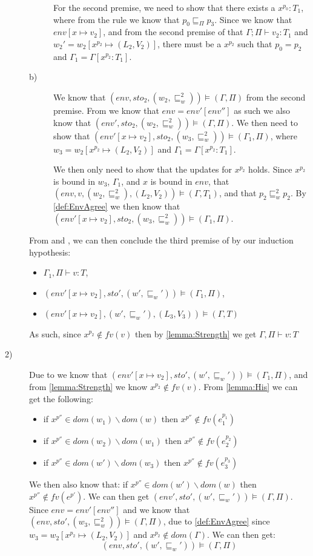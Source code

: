 \begin{description}
\begin{description}
			For the second premise, we need to show that there exists a $x^{p_0}:T_1$, where from the  rule we know that $p_0\sqsubseteq_\Pi p_3$.
			Since we know that $env[x\mapsto v_2]$, and from the second premise of  that $\Gamma;\Pi\vdash v_2:T_1$ and $w_2'=w_2[x^{p_2}\mapsto(L_2,V_2)]$, there must be a $x^{p_2}$ such that $p_0=p_2$ and $\Gamma_1=\Gamma[x^{p_2}:T_1]$.

		\item[b)] We know that $(env,sto_2,(w_2,\sqsubseteq_w^2))\models(\Gamma,\Pi)$ from the second premise.
			From  we know that $env=env'[env'']$ as such we also know that $(env',sto_2,(w_2,\sqsubseteq_w^2))\models(\Gamma,\Pi)$.
			We then need to show that $(env'[x\mapsto v_2],sto_2,(w_3,\sqsubseteq_w^2))\models(\Gamma_1,\Pi)$, where $w_3=w_2[x^{p_2}\mapsto(L_2,V_2)]$ and $\Gamma_1=\Gamma[x^{p_2}:T_1]$.
		
			We then only need to show that the updates for $x^{p_2}$ holds.
			Since $x^{p_2}$ is bound in $w_3$, $\Gamma_1$, and $x$ is bound in $env$, that $(env,v,(w_2,\sqsubseteq_w^2),(L_2,V_2))\models(\Gamma,T_1)$, and that $p_2 \sqsubseteq_w^2 p_2$.
			By \cref{def:EnvAgree} we then know that $(env'[x\mapsto v_2],sto_2,(w_3,\sqsubseteq_w^2))\models(\Gamma_1,\Pi)$.
	\end{description}
	From  and , we can then conclude the third premise of  by our induction hypothesis:
	\begin{itemize}
		\item $\Gamma_1,\Pi\vdash v:T$,
		\item $(env'[x\mapsto v_2],sto',(w',\sqsubseteq_w'))\models(\Gamma_1,\Pi)$,
		\item $(env'[x\mapsto v_2],(w',\sqsubseteq_w'),(L_3,V_3))\models(\Gamma,T)$
	\end{itemize}
	As such, since $x^{p_2}\notin fv(v)$ then by \cref{lemma:Strength} we get
	$\Gamma,\Pi\vdash v:T$

\item[2)] Due to  we know that $(env'[x\mapsto v_2],sto',(w',\sqsubseteq_w'))\models(\Gamma_1,\Pi)$, and from \cref{lemma:Strength} we know $x^{p_2}\notin fv(v)$.
	From \cref{lemma:His} we can get the following:
	\begin{itemize}
		\item if $x^{p''}\in dom(w_1)\backslash dom(w)$ then $x^{p''}\notin fv(e_1^{p_1})$
		\item if $x^{p''}\in dom(w_2)\backslash dom(w_1)$ then $x^{p''}\notin fv(e_2^{p_2})$
		\item if $x^{p''}\in dom(w')\backslash dom(w_3)$ then $x^{p''}\notin fv(e_3^{p_3})$
	\end{itemize}
	We then also know that: if $x^{p''}\in dom(w')\backslash dom(w)$ then $x^{p''}\notin fv(e^{p'})$.
	We can then get $(env',sto',(w',\sqsubseteq_w'))\models(\Gamma,\Pi)$.
	Since $env=env'[env'']$ and we know that $(env,sto',(w_3,\sqsubseteq_w^2))\models(\Gamma,\Pi)$, due to \cref{def:EnvAgree} since $w_3=w_2[x^{p_2}\mapsto(L_2,V_2)]$ and $x^{p_2}\notin dom(\Gamma)$.
	We can then get:
	$$(env,sto',(w',\sqsubseteq_w'))\models(\Gamma,\Pi)$$


\end{description}
